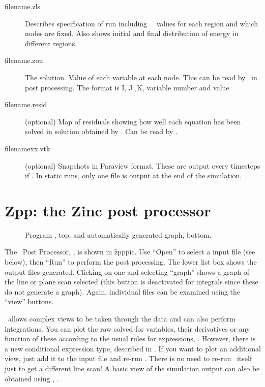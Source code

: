 \documentclass[a4paper,twoside,11pt]{book}
\begin{document}
\begin{description}
  \item[filename.zls] Describes specification of run including \caf\,
    \qg\ values for each region and which nodes are fixed. Also shows
    initial and final distribution of energy in different regions.

  \item[filename.zou] The solution. Value of each variable at each node. This can be
    read by \zpp\ in post processing. The format is I, J ,K, variable
    number and value. 

  \item[filename.resid] (optional) Map of residuals showing how well each
    equation has been solved in solution obtained by \zinc. Can be
    read by .

  \item[filenamexx.vtk] (optional) Snapshots in Paraview format. These are
    output every  timesteps if . In
    static runs, only one  file is output at the end of
    the simulation.
\end{description}

\chapter{Zpp: the Zinc post processor}
\label{zppchap}

\begin{figure}
  \caption{Program \zpp, top, and automatically generated graph, bottom.}
  \label{zpppic}
\end{figure}

The \zinc\ Post Processor, \zpp, is shown in \f{zpppic}. Use ``Open''
to select a  input file (see below), then ``Run'' to
perform the post processing. The lower list box shows the output files
generated. Clicking on one and selecting ``graph'' shows a graph of
the line or plane scan selected (this button is deactivated for
integrals since these do not generate a graph). Again, individual
files can be examined using the ``view'' buttons.

\zpp\ allows complex views to be taken through the data and can also
perform integrations. You can plot the raw solved-for variables, their
derivatives or any function of these according to the usual rules for
expressions, . However, there is a new conditional
expression type, described in .  If you want to plot an additional
view, just add it to the input file and re-run \zpp. There is no need to re-run
\zinc\ itself just to get a different line scan! A basic view of the
simulation output can also be obtained using \zmesh, .
\end{document}
